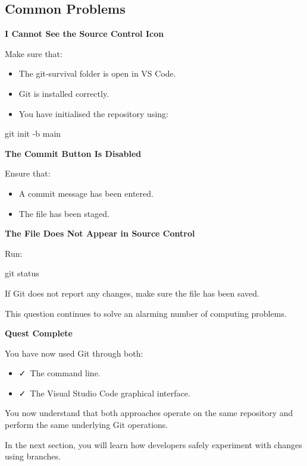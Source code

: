 \documentclass{csc2059practical}
\begin{document}
\subsection{Common Problems}
\begin{commonerror}
\textbf{I Cannot See the Source Control Icon}\par
\medskip
Make sure that:
\end{commonerror}
\begin{itemize}
  \item The git-survival folder is open in VS Code.
  \item Git is installed correctly.
  \item You have initialised the repository using:
\end{itemize}
\begin{terminalplain}
git init -b main
\end{terminalplain}
\begin{commonerror}
\textbf{The Commit Button Is Disabled}\par
\medskip
Ensure that:
\end{commonerror}
\begin{itemize}
  \item A commit message has been entered.
  \item The file has been staged.
\end{itemize}
\begin{commonerror}
\textbf{The File Does Not Appear in Source Control}\par
\medskip
Run:
\end{commonerror}
\begin{terminalplain}
git status
\end{terminalplain}
If Git does not report any changes, make sure the file has been saved.

This question continues to solve an alarming number of computing problems.

\begin{wrapupbox}
\textbf{Quest Complete}\par
\medskip
You have now used Git through both:

\begin{itemize}
  \item \faCheck\ The command line.
  \item \faCheck\ The Visual Studio Code graphical interface.
\end{itemize}

You now understand that both approaches operate on the same repository and perform the same underlying Git operations.

In the next section, you will learn how developers safely experiment with changes using branches.
\end{wrapupbox}
\end{document}
